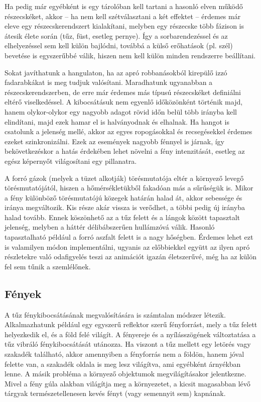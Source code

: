Ha pedig már egyébként is egy tárolóban kell tartani a hasonló elven működő részecskéket, akkor -- ha nem kell szétválasztani a két effektet -- érdemes már eleve egy részecskerendszert kialakítani, melyben egy részecske több fázison is átesik élete során (tűz, füst, esetleg pernye). Így a sorbarendezéssel és az elhelyezéssel sem kell külön bajlódni, továbbá a külső erőhatások (pl. szél) bevetése is egyszerűbbé válik, hiszen nem kell külön minden rendszerre beállítani.

Sokat javíthatunk a hangulaton, ha az apró robbanásokból kirepülő izzó fadarabkákat is meg tudjuk valósítani. Maradhatunk ugyanabban a részecskerendszerben, de erre már érdemes más típusú részecskéket definiálni eltérő viselkedéssel. A kibocsátásuk nem egyenlő időközönként történik majd, hanem olykor-olykor egy nagyobb adagot rövid időn belül több irányba kell elindítani, majd ezek hamar el is halványodnak és elhalnak. Ha hangot is csatolunk a jelenség mellé, akkor az egyes ropogásokkal és recsegésekkel érdemes ezeket szinkronizálni. Ezek az események nagyobb fénnyel is járnak, így bekövetkezéskor a hatás érdekében lehet növelni a fény intenzitását, esetleg az egész képernyőt világosítani egy pillanatra. 

A forró gázok (melyek a tüzet alkotják) törésmutatója eltér a környező levegő törésmutatójától, hiszen a hőmérsékletükből fakadóan más a sűrűségük is. Mikor a fény különböző törésmutatójú közegek határán halad át, akkor sebessége és iránya megváltozik. Kis része akár vissza is verődhet, a többi pedig új irányba halad tovább. Ennek köszönhető az a tűz felett és a lángok között tapasztalt jelenség, melyben a háttér délibábszerűen hullámzóvá válik. Hasonló tapasztalható például a forró aszfalt felett is a nagy hőségben. Érdemes lehet ezt is valamilyen módon implementálni, ugyanis az előbbiekkel együtt az ilyen apró részletekre való odafigyelés teszi az animációt igazán életszerűvé, még ha az külön fel sem tűnik a szemlélőnek.

\subsection{Fények}
A tűz fénykibocsátásának megvalósítására is számtalan módszer létezik. Alkalmazhatunk például egy egyszerű reflektor szerű fényforrást, mely a tűz felett helyezkedik el, és a föld felé világít. A fényereje és a nyílásszögének változtatása a tűz vibráló fénykibocsátását utánozza. Ha viszont a tűz mellett egy letörés vagy szakadék található, akkor amennyiben a fényforrás nem a földön, hanem jóval felette van, a szakadék oldala is meg lesz világítva, ami egyébként árnyékban lenne. A másik probléma a környező objektumok megvilágításakor jelentkezne. Mivel a fény gúla alakban világítja meg a környezetet, a kicsit magasabban lévő tárgyak természetellenesen kevés fényt (vagy semennyit sem) kapnának.


